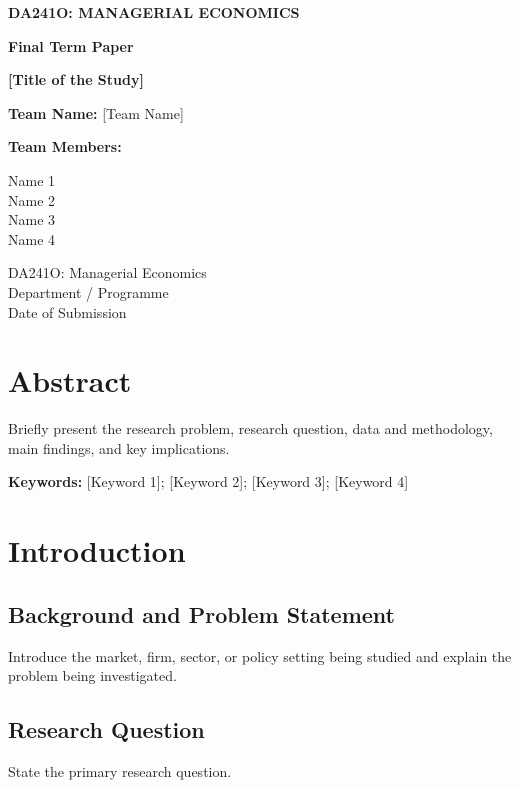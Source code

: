 \documentclass[12pt,a4paper]{article}
\begin{document}
\hypersetup{pageanchor=false}
\begin{titlepage}
\centering
\vspace*{2cm}
{\Large\bfseries DA241O: MANAGERIAL ECONOMICS\par}
\vspace{1.5cm}
{\LARGE\bfseries Final Term Paper\par}
\vspace{1.5cm}
{\Large\bfseries [Title of the Study]\par}
\vspace{2cm}
{\large\textbf{Team Name:} [Team Name]\par}
\vspace{0.75cm}
{\large\textbf{Team Members:}\par}
\vspace{0.3cm}
{\large Name 1\\
Name 2\\
Name 3\\
Name 4\par}
\vfill
{\large DA241O: Managerial Economics\\
Department / Programme\\
Date of Submission\par}
\end{titlepage}
\hypersetup{pageanchor=true}
\setcounter{page}{1}

\section*{Abstract}
Briefly present the research problem, research question, data and methodology, main findings, and key implications.

\vspace{0.5cm}
\textbf{Keywords:} [Keyword 1]; [Keyword 2]; [Keyword 3]; [Keyword 4]

\section{Introduction}
\subsection{Background and Problem Statement}
Introduce the market, firm, sector, or policy setting being studied and explain the problem being investigated.

\subsection{Research Question}
State the primary research question.
\end{document}
